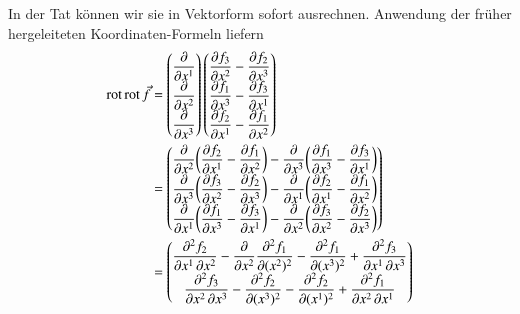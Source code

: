 In der Tat können wir sie in Vektorform sofort ausrechnen.
Anwendung der früher hergeleiteten Koordinaten-Formeln liefern
\bgroup
\renewcommand{\arraystretch}{1.9}
\begin{align}
\operatorname{rot}\operatorname{rot}\vec{f}
&=
\begin{pmatrix}
\displaystyle
\frac{\partial}{\partial x^1}\\
\displaystyle
\frac{\partial}{\partial x^2}\\
\displaystyle
\frac{\partial}{\partial x^3}
\end{pmatrix}
\begin{pmatrix}
\displaystyle
\frac{\partial f_3}{\partial x^2} - \frac{\partial f_2}{\partial x^3}\\
\displaystyle
\frac{\partial f_1}{\partial x^3} - \frac{\partial f_3}{\partial x^1}\\
\displaystyle
\frac{\partial f_2}{\partial x^1} - \frac{\partial f_1}{\partial x^2}
\end{pmatrix}
\notag
\\
&=
\begin{pmatrix}
\displaystyle
\frac{\partial}{\partial x^2}
\biggl(
\frac{\partial f_2}{\partial x^1} - \frac{\partial f_1}{\partial x^2}
\biggr)
-
\frac{\partial}{\partial x^3}
\biggl(
\frac{\partial f_1}{\partial x^3} - \frac{\partial f_3}{\partial x^1}
\biggr)
\\
\displaystyle
\frac{\partial}{\partial x^3}
\biggl(
\frac{\partial f_3}{\partial x^2} - \frac{\partial f_2}{\partial x^3}
\biggr)
-
\frac{\partial}{\partial x^1}
\biggl(
\frac{\partial f_2}{\partial x^1} - \frac{\partial f_1}{\partial x^2}
\biggr)
\\
\displaystyle
\frac{\partial}{\partial x^1}
\biggl(
\frac{\partial f_1}{\partial x^3} - \frac{\partial f_3}{\partial x^1}
\biggr)
-
\frac{\partial}{\partial x^2}
\biggl(
\frac{\partial f_3}{\partial x^2} - \frac{\partial f_2}{\partial x^3}
\biggr)
\end{pmatrix}
\notag
\\
&=
\begin{pmatrix}
\displaystyle
\frac{\partial^2 f_2}{\partial x^1\,\partial x^2}
-
\frac{\partial}{\partial x^2}
\frac{\partial^2 f_1}{\partial (x^2)^2}
-
\frac{\partial^2 f_1}{\partial (x^3)^2}
+
\frac{\partial^2 f_3}{\partial x^1\,\partial x^3}
\\
\displaystyle
\frac{\partial^2 f_3}{\partial x^2\,\partial x^3}
-
\frac{\partial^2 f_2}{\partial (x^3)^2}
-
\frac{\partial^2 f_2}{\partial (x^1)^2}
+
\frac{\partial^2 f_1}{\partial x^2\,\partial x^1}

\end{pmatrix}
\end{align}
